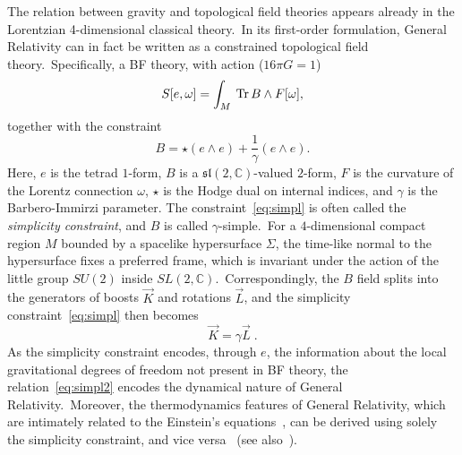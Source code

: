 \documentclass[11pt]{article}
\newcommand{\C}{\mathbb{C}}
\newcommand{\Tr}[1]{\:{\rm Tr}\,#1}
\theoremstyle{definition}
\numberwithin{equation}{section}
\begin{document}
The relation between gravity and topological field theories appears already in the Lorentzian 4-dimensional classical theory.~In its first-order formulation, General Relativity can in fact be written as a constrained topological field theory.~Specifically, a BF theory, with action ($16\pi G=1$)
    \begin{equation}
        S[e,\omega]= \int_M \Tr{B \wedge F[\omega]},
    \end{equation}
    together with the constraint
    \begin{equation}
    \label{eq:simpl}
        B = \star(e \wedge e) + \frac{1}{\gamma} (e \wedge e).
    \end{equation}
    Here, $e$ is the tetrad $1$-form, $B$ is a $\mathfrak{sl}(2,\C)$-valued $2$-form, $F$ is the curvature of the Lorentz connection $\omega$, $\star$ is the Hodge dual on internal indices, and $\gamma$ is the Barbero-Immirzi parameter. The constraint~\eqref{eq:simpl} is often called the \emph{simplicity constraint}, and $B$ is called $\gamma$-simple.~For a $4$-dimensional compact region $M$ bounded by a spacelike hypersurface $\Sigma$, the time-like normal to the hypersurface fixes a preferred frame, which is invariant under the action of the little group $SU(2)$ inside $SL(2,\C)$.~Correspondingly, the $B$ field splits into the generators of boosts $\vec{K}$ and rotations $\vec{L}$, and the simplicity constraint~\eqref{eq:simpl} then becomes
    \begin{equation}\label{eq:simpl2}
        \vec{K}=\gamma \vec{L}\;.
    \end{equation}
    As the simplicity constraint encodes, through $e$, the information about the local gravitational degrees of freedom not present in BF theory, the relation~\eqref{eq:simpl2} encodes the dynamical nature of General Relativity.~Moreover, the thermodynamics features of General Relativity, which are intimately related to the Einstein's equations~\cite{Jacobson_1995}, can be derived using solely the simplicity constraint, and vice versa~\cite{Smolin:2012ys,Smolin_2017} (see also~\cite{Bianchi:2012ui}).
\end{document}
